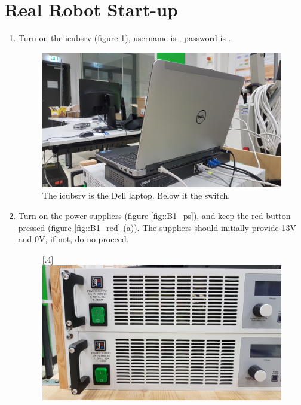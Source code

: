 \section{Real Robot Start-up}
\label{sec::B1_rr}
\begin{enumerate}
	\item Turn on the icubsrv (figure \ref{fig::B1_icubsrv}), username is , password is .
	\begin{figure}[h!]
		\centering
		\includegraphics[scale=.04]{chapters/06_appendix/img/icubsrv.jpg}
		\caption{The icubsrv is the Dell laptop. Below it the switch.}
		\label{fig::B1_icubsrv}
	\end{figure}
	\item Turn on the power suppliers (figure \ref{fig::B1_ps}), and keep the red button pressed (figure \ref{fig::B1_red} (a)). The suppliers should initially provide 13V and 0V, if not, do no proceed.
	\begin{figure}[h!]
		\centering
		[.4\linewidth]{\includegraphics[scale=.04]{chapters/06_appendix/img/power_supply.jpg}}

\end{figure}
\end{enumerate}
